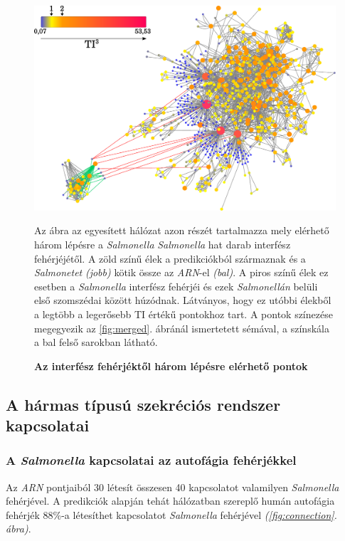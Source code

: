 \documentclass[a4paper,12pt]{article}
\newenvironment{imgdesc}{
		\small
		\singlespacing
		\begin{center}

	}{
		\end{center}
	}
\begin{document}
			\begin{figure}[H]
				\includegraphics[scale=0.50]{img/merged-3-step-from-connecting-salmonella.pdf}
				\centering
				\caption{ \textbf{Az interfész fehérjéktől három lépésre elérhető pontok}}
				\begin{imgdesc}
					Az ábra az egyesített hálózat azon részét tartalmazza mely elérhető három lépésre a \textit{Salmonella} \textit{Salmonella} hat darab interfész fehérjéjétől. A zöld színű élek a predikciókból származnak és a \textit{Salmonetet} \textit{(jobb)} kötik össze az \textit{ARN}-el \textit{(bal)}. A piros színű élek ez esetben a \textit{Salmonella} interfész fehérjéi és ezek \textit{Salmonellán} belüli első szomszédai között húzódnak. Látványos, hogy ez utóbbi élekből a legtöbb a legerősebb TI értékű pontokhoz tart. A pontok színezése megegyezik az \ref{fig:merged}. ábránál ismertetett sémával, a színskála a bal felső sarokban látható.
				\end{imgdesc}
				\label{fig:merged-3-step}
			\end{figure}

	\subsection{A hármas típusú szekréciós rendszer kapcsolatai}

		\subsubsection{A \textit{Salmonella} kapcsolatai az autofágia fehérjékkel}

		Az \textit{ARN} pontjaiból 30 létesít összesen 40 kapcsolatot valamilyen \textit{Salmonella} fehérjével. A predikciók alapján tehát hálózatban szereplő humán autofágia fehérjék 88\%-a létesíthet kapcsolatot \textit{Salmonella} fehérjével \textit{(\ref{fig:connection}. ábra)}.
\end{document}
